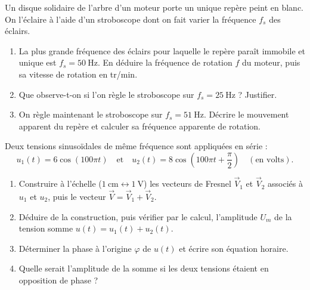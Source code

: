 \documentclass[11pt]{article}
\begin{document}
\begin{exercice}
Un disque solidaire de l'arbre d'un moteur porte un unique repère peint en blanc. On l'éclaire à l'aide d'un stroboscope dont on fait varier la fréquence $f_s$ des éclairs.
\begin{enumerate}
\item La plus grande fréquence des éclairs pour laquelle le repère paraît immobile et unique est $f_s = 50\ \text{Hz}$. En déduire la fréquence de rotation $f$ du moteur, puis sa vitesse de rotation en tr/min.
\item Que observe-t-on si l'on règle le stroboscope sur $f_s = 25\ \text{Hz}$ ? Justifier.
\item On règle maintenant le stroboscope sur $f_s = 51\ \text{Hz}$. Décrire le mouvement apparent du repère et calculer sa fréquence apparente de rotation.
\end{enumerate}
\end{exercice}

\begin{exercice}
Deux tensions sinusoïdales de même fréquence sont appliquées en série :
\[ u_1(t) = 6\cos(100\pi t) \quad \text{et} \quad u_2(t) = 8\cos\left(100\pi t + \frac{\pi}{2}\right) \quad (\text{en volts}). \]
\begin{enumerate}
\item Construire à l'échelle ($1\ \text{cm} \leftrightarrow 1\ \text{V}$) les vecteurs de Fresnel $\vec{V}_1$ et $\vec{V}_2$ associés à $u_1$ et $u_2$, puis le vecteur $\vec{V} = \vec{V}_1 + \vec{V}_2$.
\item Déduire de la construction, puis vérifier par le calcul, l'amplitude $U_m$ de la tension somme $u(t) = u_1(t) + u_2(t)$.
\item Déterminer la phase à l'origine $\varphi$ de $u(t)$ et écrire son équation horaire.
\item Quelle serait l'amplitude de la somme si les deux tensions étaient en opposition de phase ?
\end{enumerate}
\end{exercice}
\end{document}
